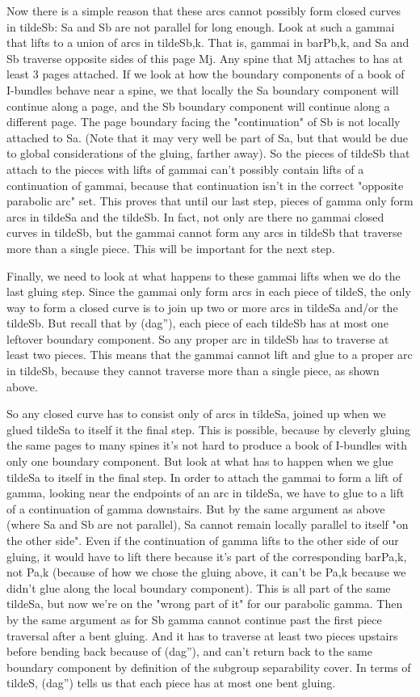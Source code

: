 \documentclass[12pt]{amsart}
\theoremstyle{definition}
\theoremstyle{remark}
\begin{document}
Now there is a simple reason that these arcs cannot possibly form closed curves
in tildeSb: Sa and Sb are not parallel for long enough. Look at such a gammai
that lifts to a union of arcs in tildeSb,k.  That is, gammai in barPb,k, and Sa
and Sb traverse opposite sides of this page Mj. Any spine that Mj attaches to
has at least 3 pages attached. If we look at how the boundary components of
a book of I-bundles behave near a spine, we that locally the Sa boundary
component will continue along a page, and the Sb boundary component will
continue along a different page. The page boundary facing the "continuation" of
Sb is not locally attached to Sa. (Note that it may very well be part of Sa,
but that would be due to global considerations of the gluing, farther away). So
the pieces of tildeSb that attach to the pieces with lifts of gammai can't
possibly contain lifts of a continuation of gammai, because that continuation
isn't in the correct "opposite parabolic arc" set. This proves that until our
last step, pieces of gamma only form arcs in tildeSa and the tildeSb. In fact,
not only are there no gammai closed curves in tildeSb, but the gammai cannot
form any arcs in tildeSb that traverse more than a single piece. This will be
important for the next step.

Finally, we need to look at what happens to these gammai lifts when we do the
last gluing step. Since the gammai only form arcs in each piece of tildeS, the
only way to form a closed curve is to join up two or more arcs in tildeSa
and/or the tildeSb.  But recall that by (dag''), each piece of each tildeSb has
at most one leftover boundary component. So any proper arc in tildeSb has to
traverse at least two pieces. This means that the gammai cannot lift and glue
to a proper arc in tildeSb, because they cannot traverse more than a single
piece, as shown above.

So any closed curve has to consist only of arcs in tildeSa, joined up when we
glued tildeSa to itself it the final step. This is possible, because by
cleverly gluing the same pages to many spines it's not hard to produce a book
of I-bundles with only one boundary component. But look at what has to happen
when we glue tildeSa to itself in the final step. In order to attach the gammai
to form a lift of gamma, looking near the endpoints of an arc in tildeSa, we
have to glue to a lift of a continuation of gamma downstairs. But by the same
argument as above (where Sa and Sb are not parallel), Sa cannot remain locally
parallel to itself "on the other side". Even if the continuation of gamma lifts
to the other side of our gluing, it would have to lift there because it's part
of the corresponding barPa,k, not Pa,k (because of how we chose the gluing
above, it can't be Pa,k because we didn't glue along the local boundary
component). This is all part of the same tildeSa, but now we're on the "wrong
part of it" for our parabolic gamma. Then by the same argument as for Sb gamma
cannot continue past the first piece traversal after a bent gluing. And it has
to traverse at least two pieces upstairs before bending back because of
(dag''), and can't return back to the same boundary component by definition of
the subgroup separability cover. In terms of tildeS, (dag'') tells us that each
piece has at most one bent gluing.
\end{document}

